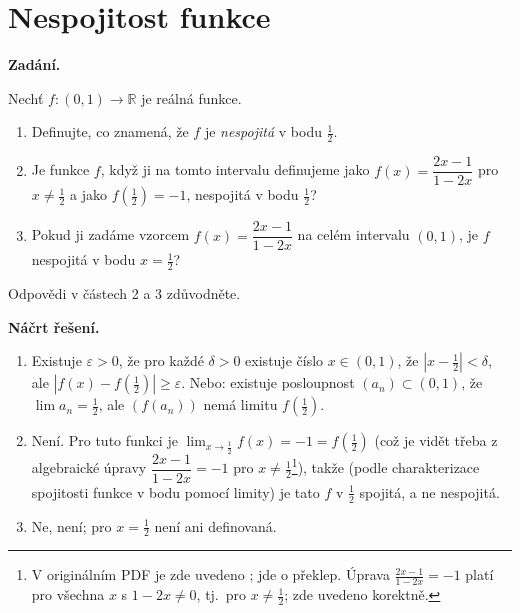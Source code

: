 \section{Nespojitost funkce}

\noindent\textbf{Zadání.}\par
Nechť $f : (0, 1) \to \mathbb{R}$ je reálná funkce.
\begin{enumerate}
  \item Definujte, co znamená, že $f$ je \emph{nespojitá} v bodu $\tfrac{1}{2}$.
  \item Je funkce $f$, když ji na tomto intervalu definujeme jako $f(x) = \dfrac{2x-1}{1-2x}$ pro $x \neq \tfrac{1}{2}$ a jako $f\!\left(\tfrac{1}{2}\right) = -1$, nespojitá v bodu $\tfrac{1}{2}$?
  \item Pokud ji zadáme vzorcem $f(x) = \dfrac{2x-1}{1-2x}$ na celém intervalu $(0, 1)$, je $f$ nespojitá v bodu $x = \tfrac{1}{2}$?
\end{enumerate}
Odpovědi v částech 2 a 3 zdůvodněte.

\medskip
\noindent\textbf{Náčrt řešení.}\par
\begin{enumerate}
  \item Existuje $\varepsilon > 0$, že pro každé $\delta > 0$ existuje číslo $x \in (0, 1)$, že $\left|x - \tfrac{1}{2}\right| < \delta$, ale $\left|f(x) - f\!\left(\tfrac{1}{2}\right)\right| \geq \varepsilon$. Nebo: existuje posloupnost $(a_n) \subset (0, 1)$, že $\lim a_n = \tfrac{1}{2}$, ale $(f(a_n))$ nemá limitu $f\!\left(\tfrac{1}{2}\right)$.
  \item Není. Pro tuto funkci je $\lim_{x \to \frac{1}{2}} f(x) = -1 = f\!\left(\tfrac{1}{2}\right)$ (což je vidět třeba z algebraické úpravy $\dfrac{2x-1}{1-2x} = -1$ pro $x \neq \tfrac{1}{2}$\footnote{V originálním PDF je zde uvedeno ; jde o překlep. Úprava $\frac{2x-1}{1-2x} = -1$ platí pro všechna $x$ s $1-2x \neq 0$, tj.\ pro $x \neq \frac{1}{2}$; zde uvedeno korektně.}), takže (podle charakterizace spojitosti funkce v bodu pomocí limity) je tato $f$ v $\tfrac{1}{2}$ spojitá, a ne nespojitá.
  \item Ne, není; pro $x = \tfrac{1}{2}$ není ani definovaná.
\end{enumerate}
